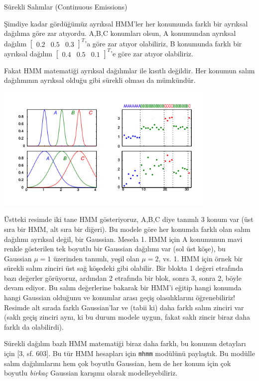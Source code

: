 \documentclass[12pt,fleqn]{article}\usepackage{../../common}
\begin{document}
Sürekli Salımlar (Continuous Emissions)

Şimdiye kadar gördüğümüz ayrıksal HMM'ler her konumunda farklı bir ayrıksal
dağılıma göre zar atıyordu. A,B,C konumları olsun, A konumundan
ayrıksal dağılım $\left[\begin{array}{ccc} 0.2 & 0.5 &
    0.3 \end{array}\right]^T$'a göre zar atıyor olabiliriz, B konumunda
farklı bir ayrıksal dağılım $\left[\begin{array}{ccc} 0.4 & 0.5 &
    0.1 \end{array}\right]^T$'e göre zar atıyor olabiliriz.

Fakat HMM matematiği ayrıksal dağılımlar ile kısıtlı değildir. Her konumun
salım dağılımının ayrıksal olduğu gibi sürekli olması da mümkündür.

\includegraphics[height=6cm]{tser_hmm_10.png}

Üstteki resimde iki tane HMM gösteriyoruz, A,B,C diye tanımlı 3 konum var
(üst sıra bir HMM, alt sıra bir diğeri). Bu modele göre her konumda farklı
olan salım dağılımı ayrıksal değil, bir Gaussian. Mesela 1. HMM için A
konumunun mavi renkle gösterilen tek boyutlu bir Gaussian dağılımı var (sol
üst köşe), bu Gaussian $\mu=1$ üzerinden tanımlı, yeşil olan $\mu=2$,
vs. 1. HMM için örnek bir sürekli salım zinciri üst sağ köşedeki gibi
olabilir. Bir blokta 1 değeri etrafında bazı değerler görüyoruz, ardından 2
etrafında bir blok, sonra 3, sonra 2, böyle devam ediyor. Bu salım
değerlerine bakarak bir HMM'i eğitip hangi konumda hangi Gaussian olduğunu
ve konumlar arası geçiş olasılıklarını öğrenebiliriz! Resimde alt sırada
farklı Gaussian'lar ve (tabii ki) daha farklı salım zinciri var (saklı
geçiş zinciri aynı, ki bu durum modele uygun, fakat saklı zincir biraz daha
farklı da olabilirdi).

Sürekli dağılım bazlı HMM matematiği biraz daha farklı, bu konunun
detayları için [3, sf. 603]. Bu tür HMM hesapları için \verb!mhmm!
modülünü paylaştık. Bu modülle salım dağılımlarını hem çok boyutlu
Gaussian, hem de her konum için çok boyutlu {\em birkaç} Gaussian karışımı
olarak modelleyebiliriz. 
\end{document}
